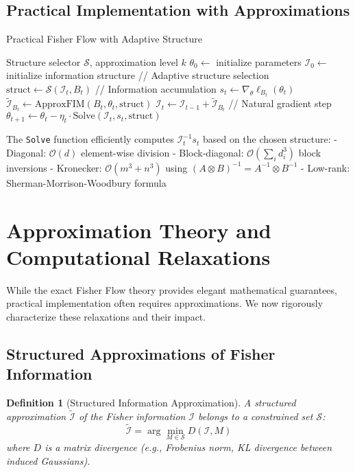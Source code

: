 \documentclass[11pt]{article}
\newtheorem{definition}[theorem]{Definition}
\begin{document}
\subsection{Practical Implementation with Approximations}

\begin{algorithm}[h]
\caption{Practical Fisher Flow with Adaptive Structure}
\label{alg:practical_lpi}
\begin{algorithmic}[1]
\Require Structure selector $\mathcal{S}$, approximation level $k$
\State $\theta_0 \gets$ initialize parameters
\State $\mathcal{I}_0 \gets$ initialize information structure
\State // Adaptive structure selection
\State $\text{struct} \gets \mathcal{S}(\mathcal{I}_t, B_t)$ 
\EndIf
\State // Information accumulation
\State $s_t \gets \nabla_\theta \ell_{B_t}(\theta_t)$
\State $\tilde{\mathcal{I}}_{B_t} \gets \text{ApproxFIM}(B_t, \theta_t, \text{struct})$
\State $\mathcal{I}_t \gets \mathcal{I}_{t-1} + \tilde{\mathcal{I}}_{B_t}$
\State // Natural gradient step
\State $\theta_{t+1} \gets \theta_t - \eta_t \cdot \text{Solve}(\mathcal{I}_t, s_t, \text{struct})$
\EndFor
\end{algorithmic}
\end{algorithm}

The \texttt{Solve} function efficiently computes $\mathcal{I}_t^{-1}s_t$ based on the chosen structure:
- Diagonal: $\mathcal{O}(d)$ element-wise division
- Block-diagonal: $\mathcal{O}(\sum_i d_i^3)$ block inversions  
- Kronecker: $\mathcal{O}(m^3 + n^3)$ using $(A \otimes B)^{-1} = A^{-1} \otimes B^{-1}$
- Low-rank: Sherman-Morrison-Woodbury formula

\section{Approximation Theory and Computational Relaxations}

While the exact Fisher Flow theory provides elegant mathematical guarantees, practical implementation often requires approximations. We now rigorously characterize these relaxations and their impact.

\subsection{Structured Approximations of Fisher Information}

\begin{definition}[Structured Information Approximation]
A structured approximation $\tilde{\mathcal{I}}$ of the Fisher information $\mathcal{I}$ belongs to a constrained set $\mathcal{S}$:
\begin{equation}
\tilde{\mathcal{I}} = \arg\min_{M \in \mathcal{S}} D(\mathcal{I}, M)
\end{equation}
where $D$ is a matrix divergence (e.g., Frobenius norm, KL divergence between induced Gaussians).
\end{definition}
\end{document}
